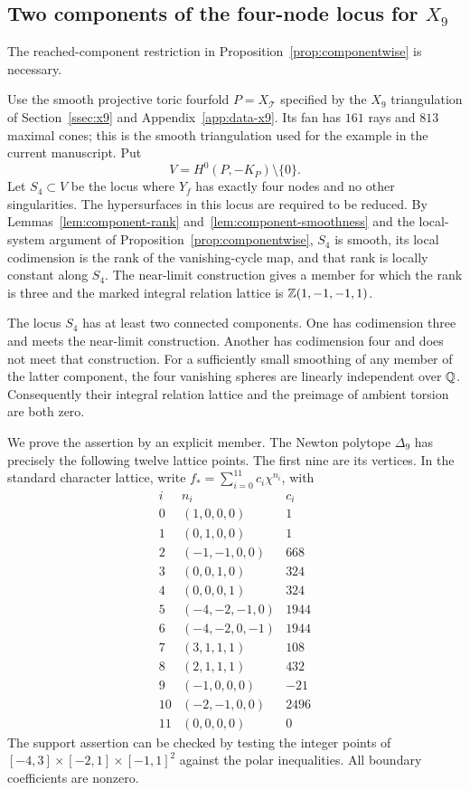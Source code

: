 \subsection{Two components of the four-node locus for \texorpdfstring{$X_9$}{X9}}\label{ssec:x9components}

The reached-component restriction in Proposition~\ref{prop:componentwise} is necessary.

Use the smooth projective toric fourfold $P=X_{\mathcal T}$ specified
by the $X_9$ triangulation of Section~\ref{ssec:x9} and Appendix~\ref{app:data-x9}. Its fan has $161$ rays
and $813$ maximal cones; this is the smooth triangulation used for
the example in the current manuscript. Put
\[
 V=H^0(P,-K_P)\setminus\{0\}.
\]
Let $S_4\subset V$ be the locus where $Y_f$ has exactly four nodes
and no other singularities.
The hypersurfaces in this locus are required to be reduced.
By Lemmas~\ref{lem:component-rank} and~\ref{lem:component-smoothness} and the local-system argument of Proposition~\ref{prop:componentwise}, $S_4$
is smooth, its local codimension is the rank of the vanishing-cycle
map, and that rank is locally constant along $S_4$.
The near-limit construction gives a member for which the rank is three
and the marked integral relation lattice is $\mathbb Z(1,-1,-1,1)$.

\begin{proposition}\label{prop:x9different}
The locus $S_4$ has at least two connected components. One has
codimension three and meets the near-limit construction. Another has
codimension four and does not meet that construction. For a sufficiently
small smoothing of any member of the latter component, the four
vanishing spheres are linearly independent over $\mathbb Q$. Consequently
their integral relation lattice and the preimage of ambient torsion
are both zero.
\end{proposition}

We prove the assertion by an explicit member. The Newton polytope
$\Delta_9$ has precisely the following twelve lattice points.
The first nine are its vertices. In the standard character lattice,
write $f_*=\sum_{i=0}^{11}c_i\chi^{n_i}$, with
\begin{equation}\label{eq:x9coefficients}
\begin{array}{c|r|r}
i&n_i&c_i\\\hline
0&(1,0,0,0)&1\\
1&(0,1,0,0)&1\\
2&(-1,-1,0,0)&668\\
3&(0,0,1,0)&324\\
4&(0,0,0,1)&324\\
5&(-4,-2,-1,0)&1944\\
6&(-4,-2,0,-1)&1944\\
7&(3,1,1,1)&108\\
8&(2,1,1,1)&432\\
9&(-1,0,0,0)&-21\\
10&(-2,-1,0,0)&2496\\
11&(0,0,0,0)&0
\end{array}
\end{equation}
The support assertion can be checked by testing the integer points
of $[-4,3]\times[-2,1]\times[-1,1]^2$ against the polar inequalities.
All boundary coefficients are nonzero.

